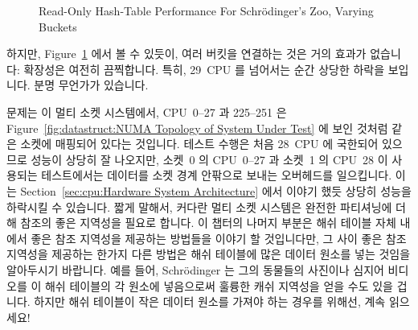 \begin{figure}[tb]
\centering
{}
\caption{Read-Only Hash-Table Performance For Schr\"odinger's Zoo, Varying Buckets}
\label{fig:datastruct:Read-Only Hash-Table Performance For Schroedinger's Zoo, Varying Buckets}
\end{figure}

하지만,
Figure~\ref{fig:datastruct:Read-Only Hash-Table Performance For Schroedinger's Zoo, Varying Buckets}
에서 볼 수 있듯이, 여러 버킷을 연결하는 것은 거의 효과가 없습니다:
확장성은 여전히 끔찍합니다.
특히, 29~CPU 를 넘어서는 순간 상당한 하락을 보입니다.
분명 무언가가 있습니다.

문제는 이 멀티 소켓 시스템에서, CPU~0--27 과 225--251 은
Figure~\ref{fig:datastruct:NUMA Topology of System Under Test}
에 보인 것처럼 같은 소켓에 매핑되어 있다는 것입니다.
테스트 수행은 처음 28~CPU 에 국한되어 있으므로 성능이 상당히 잘 나오지만,
소켓~0 의 CPU~0--27 과 소켓~1 의 CPU~28 이 사용되는 테스트에서는 데이터를 소켓
경계 안팎으로 보내는 오버헤드를 일으킵니다.
이는
Section~\ref{sec:cpu:Hardware System Architecture} 
에서 이야기 했듯 상당히 성능을 하락시킬 수 있습니다.
짧게 말해서, 커다란 멀티 소켓 시스템은 완전한 파티셔닝에 더해 참조의 좋은
지역성을 필요로 합니다.
이 챕터의 나머지 부분은 해쉬 테이블 자체 내에서 좋은 참조 지역성을 제공하는
방법들을 이야기 할 것입니다만, 그 사이 좋은 참조 지역성을 제공하는 한가지 다른
방법은 해쉬 테이블에 많은 데이터 원소를 넣는 것임을 알아두시기 바랍니다.
예를 들어, Schr\"odinger 는 그의 동물들의 사진이나 심지어 비디오를 이 해쉬
테이블의 각 원소에 넣음으로써 훌륭한 캐쉬 지역성을 얻을 수도 있을 겁니다.
하지만 해쉬 테이블이 작은 데이터 원소를 가져야 하는 경우를 위해선, 계속
읽으세요!

